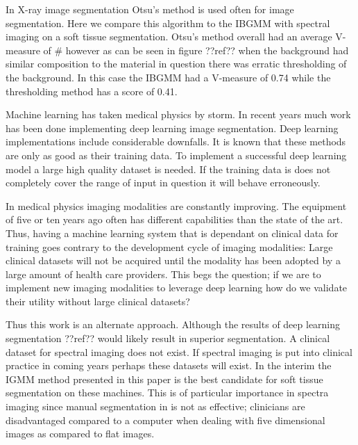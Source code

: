 \documentclass[a4paper,11pt]{article}
\begin{document}
In X-ray image segmentation Otsu's method is used often for image segmentation. Here we compare this algorithm to the IBGMM with spectral imaging on a soft tissue segmentation. Otsu's method overall had an average V-measure of \# however as can be seen in figure ??ref?? when the background had similar composition to the material in question there was erratic thresholding of the background. In this case the IBGMM had a V-measure of 0.74 while the thresholding method has a score of 0.41.


Machine learning has taken medical physics by storm. In recent years much work has been done implementing deep learning image segmentation. Deep learning implementations include considerable downfalls. It is known that these methods are only as good as their training data. To implement a successful deep learning model a large high quality dataset is needed. If the training data is does not completely cover the range of input in question it will behave erroneously.

In medical physics imaging modalities are constantly improving. The equipment of five or ten years ago often has different capabilities than the state of the art. Thus, having a machine learning system that is dependant on clinical data for training goes contrary to the development cycle of imaging modalities: Large clinical datasets will not be acquired until the modality has been adopted by a large amount of health care providers. This begs the question; if we are to implement new imaging modalities to leverage deep learning how do we validate their utility without large clinical datasets?

Thus this work is an alternate approach. Although the results of deep learning segmentation ??ref?? would likely result in superior segmentation. A clinical dataset for spectral imaging does not exist. If spectral imaging is put into clinical practice in coming years perhaps these datasets will exist. In the interim the IGMM method presented in this paper is the best candidate for soft tissue segmentation on these machines. This is of particular importance in spectra imaging since manual segmentation in is not as effective; clinicians are disadvantaged compared to a computer when dealing with five dimensional images as compared to flat images.
\end{document}
